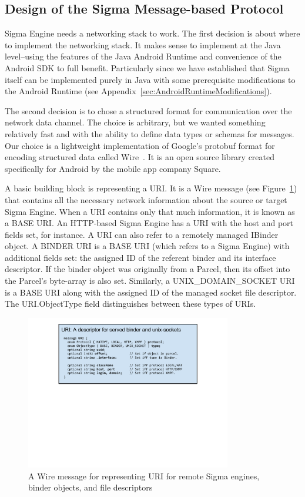 \documentclass[prodmode]{acmlarge}
\begin{document}
\subsection{Design of the Sigma Message-based Protocol}
Sigma Engine needs a networking stack to work. The first decision is about where to implement the networking stack. It makes sense to implement at the Java level--using the features of the Java Android Runtime and convenience of the Android SDK to full benefit. Particularly since we have established that Sigma itself can be implemented purely in Java with some prerequisite modifications to the Android Runtime (see Appendix~\ref{sec:AndroidRuntimeModifications}).

The second decision is to chose a structured format for communication over the network data channel. The choice is arbitrary, but we wanted something relatively fast and with the ability to define data types or schemas for messages. Our choice is a lightweight implementation of Google's protobuf format for encoding structured data called Wire~\cite{Wire,IntroWire}. It is an open source library created specifically for Android by the mobile app company Square.

A basic building block is representing a URI. It is a Wire message (see Figure~\ref{fig:WireURI}) that contains all the necessary network information about the source or target Sigma Engine. When a URI contains only that much information, it is known as a BASE URI. An HTTP-based Sigma Engine has a URI with the host and port fields set, for instance. A URI can also refer to a remotely managed IBinder object. A BINDER URI is a BASE URI (which refers to a Sigma Engine) with additional fields set: the assigned ID of the referent binder and its interface descriptor. If the binder object was originally from a Parcel, then its offset into the Parcel's byte-array is also set. Similarly, a UNIX\_DOMAIN\_SOCKET URI is a BASE URI along with the assigned ID of the managed socket file descriptor. The URI.ObjectType field distinguishes between these types of URIs.

\begin{figure}[h!]
\centering
\includegraphics[width=0.8\textwidth]{drawings/WireURI.pdf}
\caption{A Wire message for representing URI for remote Sigma engines, binder objects, and file descriptors}
\label{fig:WireURI}
\end{figure}
\end{document}
